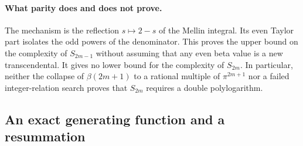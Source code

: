 \paragraph{What parity does and does not prove.}
The mechanism is the reflection $s\mapsto2-s$ of the Mellin integral.
Its even Taylor part isolates the odd powers of the denominator. This
proves the upper bound on the complexity of $S_{2m-1}$ without assuming
that any even beta value is a new transcendental.
It gives no lower bound for the complexity of $S_{2m}$.
In particular, neither the collapse of $\beta(2m+1)$ to a rational multiple
of $\pi^{2m+1}$ nor a failed integer-relation search proves that
$S_{2m}$ requires a double polylogarithm.

\subsection{An exact generating function and a resummation}

